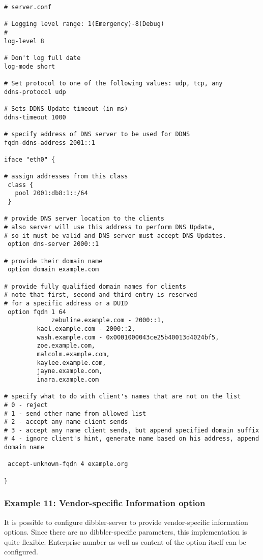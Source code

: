 \begin{lstlisting}
# server.conf

# Logging level range: 1(Emergency)-8(Debug)
# 
log-level 8

# Don't log full date
log-mode short

# Set protocol to one of the following values: udp, tcp, any
ddns-protocol udp

# Sets DDNS Update timeout (in ms)
ddns-timeout 1000

# specify address of DNS server to be used for DDNS
fqdn-ddns-address 2001::1

iface "eth0" {

# assign addresses from this class
 class {
   pool 2001:db8:1::/64
 }

# provide DNS server location to the clients
# also server will use this address to perform DNS Update,
# so it must be valid and DNS server must accept DNS Updates.
 option dns-server 2000::1

# provide their domain name
 option domain example.com

# provide fully qualified domain names for clients
# note that first, second and third entry is reserved
# for a specific address or a DUID
 option fqdn 1 64
             zebuline.example.com - 2000::1,
	     kael.example.com - 2000::2,
	     wash.example.com - 0x0001000043ce25b40013d4024bf5,
	     zoe.example.com,
	     malcolm.example.com,
	     kaylee.example.com,
	     jayne.example.com,
	     inara.example.com

# specify what to do with client's names that are not on the list
# 0 - reject
# 1 - send other name from allowed list
# 2 - accept any name client sends
# 3 - accept any name client sends, but append specified domain suffix
# 4 - ignore client's hint, generate name based on his address, append domain name

 accept-unknown-fqdn 4 example.org

}
\end{lstlisting}

\subsubsection{Example 11: Vendor-specific Information option}
\label{example-server-vendor-spec}
It is possible to configure dibbler-server to provide vendor-specific
information options. Since there are no dibbler-specific parameters,
this implementation is quite flexible. Enterprise number as well as
content of the option itself can be configured.

